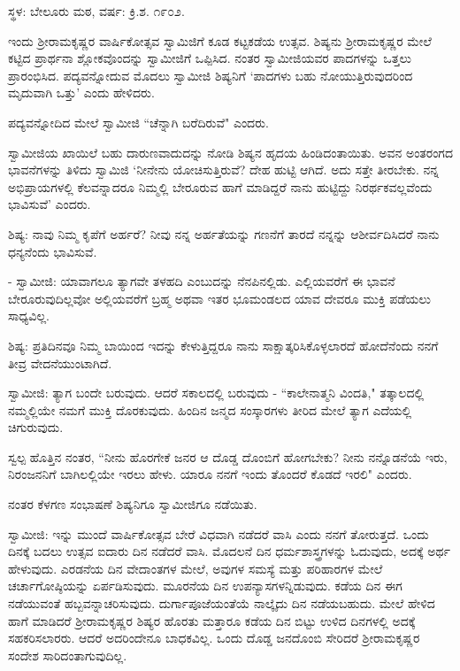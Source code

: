 \begin{center}
ಸ್ಥಳ: ಬೇಲೂರು ಮಠ, ವರ್ಷ: ಕ್ರಿ.ಶ. ೧೯೦೨.
\end{center}

ಇಂದು ಶ‍್ರೀರಾಮಕೃಷ್ಣರ ವಾರ್ಷಿಕೋತ್ಸವ ಸ್ವಾಮಿಜಿಗೆ ಕೂಡ ಕಟ್ಟಕಡೆಯ ಉತ್ಸವ. ಶಿಷ್ಯನು ಶ‍್ರೀರಾಮಕೃಷ್ಣರ ಮೇಲೆ ಕಟ್ಟಿದ ಪ್ರಾರ್ಥನಾ ಶ್ಲೋಕವೊಂದನ್ನು ಸ್ವಾಮೀಜಿಗೆ ಒಪ್ಪಿಸಿದ. ನಂತರ ಸ್ವಾಮೀಜಿಯವರ ಪಾದಗಳನ್ನು ಒತ್ತಲು ಪ್ರಾರಂಭಿಸಿದ. ಪದ್ಯವನ್ನೋದುವ ಮೊದಲು ಸ್ವಾಮೀಜಿ ಶಿಷ್ಯನಿಗೆ ‘ಪಾದಗಳು ಬಹು ನೋಯುತ್ತಿರುವುದರಿಂದ ಮೃದುವಾಗಿ ಒತ್ತು’ ಎಂದು ಹೇಳಿದರು.

ಪದ್ಯವನ್ನೋದಿದ ಮೇಲೆ ಸ್ವಾಮೀಜಿ “ಚೆನ್ನಾಗಿ ಬರೆದಿರುವೆ" ಎಂದರು.

ಸ್ವಾಮೀಜಿಯ ಖಾಯಿಲೆ ಬಹು ದಾರುಣವಾದುದನ್ನು ನೋಡಿ ಶಿಷ್ಯನ ಹೃದಯ ಹಿಂಡಿದಂತಾಯಿತು. ಅವನ ಅಂತರಂಗದ ಭಾವನೆಗಳನ್ನು ತಿಳಿದು ಸ್ವಾಮಿಜಿ ‘ನೀನೇನು ಯೋಚಿಸುತ್ತಿರುವೆ? ದೇಹ ಹುಟ್ಟಿ ಆಗಿದೆ. ಅದು ಸತ್ತೇ ತೀರಬೇಕು. ನನ್ನ ಅಭಿಪ್ರಾಯಗಳಲ್ಲಿ ಕೆಲವನ್ನಾದರೂ ನಿಮ್ಮಲ್ಲಿ ಬೇರೂರುವ ಹಾಗೆ ಮಾಡಿದ್ದರೆ ನಾನು ಹುಟ್ಟಿದ್ದು ನಿರರ್ಥಕವಲ್ಲವೆಂದು ಭಾವಿಸುವೆ’ ಎಂದರು.

ಶಿಷ್ಯ: ನಾವು ನಿಮ್ಮ ಕೃಪೆಗೆ ಅರ್ಹರೆ? ನೀವು ನನ್ನ ಅರ್ಹತೆಯನ್ನು ಗಣನೆಗೆ ತಾರದೆ ನನ್ನನ್ನು ಆಶೀರ್ವದಿಸಿದರೆ ನಾನು ಧನ್ಯನೆಂದು ಭಾವಿಸುವೆ.

- ಸ್ವಾಮೀಜಿ: ಯಾವಾಗಲೂ ತ್ಯಾಗವೇ ತಳಹದಿ ಎಂಬುದನ್ನು ನೆನಪಿನಲ್ಲಿಡು. ಎಲ್ಲಿಯವರೆಗೆ ಈ ಭಾವನೆ ಬೇರೂರುವುದಿಲ್ಲವೋ ಅಲ್ಲಿಯವರೆಗೆ ಬ್ರಹ್ಮ ಅಥವಾ ಇತರ ಭೂಮಂಡಲದ ಯಾವ ದೇವರೂ ಮುಕ್ತಿ ಪಡೆಯಲು ಸಾಧ್ಯವಿಲ್ಲ.

ಶಿಷ್ಯ: ಪ್ರತಿದಿನವೂ ನಿಮ್ಮ ಬಾಯಿಂದ ಇದನ್ನು ಕೇಳುತ್ತಿದ್ದರೂ ನಾನು ಸಾಕ್ಷಾತ್ಕರಿಸಿಕೊಳ್ಳಲಾರದೆ ಹೋದೆನೆಂದು ನನಗೆ ತೀವ್ರ ವೇದನೆಯುಂಟಾಗಿದೆ.

ಸ್ವಾಮೀಜಿ: ತ್ಯಾಗ ಬಂದೇ ಬರುವುದು. ಆದರೆ ಸಕಾಲದಲ್ಲಿ ಬರುವುದು - “ಕಾಲೇನಾತ್ಮನಿ ವಿಂದತಿ," ತತ್ಕಾಲದಲ್ಲಿ ನಮ್ಮಲ್ಲಿಯೇ ನಮಗೆ ಮುಕ್ತಿ ದೊರಕುವುದು. ಹಿಂದಿನ ಜನ್ಮದ ಸಂಸ್ಕಾರಗಳು ತೀರಿದ ಮೇಲೆ ತ್ಯಾಗ ಎದೆಯಲ್ಲಿ ಚಿಗುರುವುದು.

ಸ್ವಲ್ಪ ಹೊತ್ತಿನ ನಂತರ, “ನೀನು ಹೊರಗೇಕೆ ಜನರ ಆ ದೊಡ್ಡ ದೊಂಬಿಗೆ ಹೋಗಬೇಕು? ನೀನು ನನ್ನೊಡನೆಯೆ ಇರು, ನಿರಂಜನನಿಗೆ ಬಾಗಿಲಲ್ಲಿಯೇ ಇರಲು ಹೇಳು. ಯಾರೂ ನನಗೆ ಇಂದು ತೊಂದರೆ ಕೊಡದೆ ಇರಲಿ" ಎಂದರು.

ನಂತರ ಕೆಳಗಣ ಸಂಭಾಷಣೆ ಶಿಷ್ಯನಿಗೂ ಸ್ವಾಮೀಜಿಗೂ ನಡೆಯಿತು.

ಸ್ವಾಮೀಜಿ: ಇನ್ನು ಮುಂದೆ ವಾರ್ಷಿಕೋತ್ಸವ ಬೇರೆ ವಿಧವಾಗಿ ನಡೆದರೆ ವಾಸಿ ಎಂದು ನನಗೆ ತೋರುತ್ತದೆ. ಒಂದು ದಿನಕ್ಕೆ ಬದಲು ಉತ್ಸವ ಐದಾರು ದಿನ ನಡೆದರೆ ವಾಸಿ. ಮೊದಲನೆ ದಿನ ಧರ್ಮಶಾಸ್ತ್ರಗಳನ್ನು ಓದುವುದು, ಅದಕ್ಕೆ ಅರ್ಥ ಹೇಳುವುದು. ಎರಡನೆಯ ದಿನ ವೇದಾಂತಗಳ ಮೇಲೆ, ಅವುಗಳ ಸಮಸ್ಯೆ ಮತ್ತು ಪರಿಹಾರಗಳ ಮೇಲೆ ಚರ್ಚಾಗೋಷ್ಠಿಯನ್ನು ಏರ್ಪಡಿಸುವುದು. ಮೂರನೆಯ ದಿನ ಉಪನ್ಯಾಸಗಳನ್ನಿಡುವುದು. ಕಡೆಯ ದಿನ ಈಗ ನಡೆಯುವಂತೆ ಹಬ್ಬವನ್ನಾಚರಿಸುವುದು. ದುರ್ಗಾಪೂಜೆಯಂತೆಯೆ ನಾಲ್ಕೈದು ದಿನ ನಡೆಯಬಹುದು. ಮೇಲೆ ಹೇಳಿದ ಹಾಗೆ ಮಾಡಿದರೆ ಶ‍್ರೀರಾಮಕೃಷ್ಣರ ಶಿಷ್ಯರ ಹೊರತು ಮತ್ತಾರೂ ಕಡೆಯ ದಿನ ಬಿಟ್ಟು ಉಳಿದ ದಿನಗಳಲ್ಲಿ ಅದಕ್ಕೆ ಸಹಕರಿಸಲಾರರು. ಆದರೆ ಅದರಿಂದೇನೂ ಬಾಧಕವಿಲ್ಲ. ಒಂದು ದೊಡ್ಡ ಜನದೊಂಬಿ ಸೇರಿದರೆ ಶ‍್ರೀರಾಮಕೃಷ್ಣರ ಸಂದೇಶ ಸಾರಿದಂತಾಗುವುದಿಲ್ಲ.

